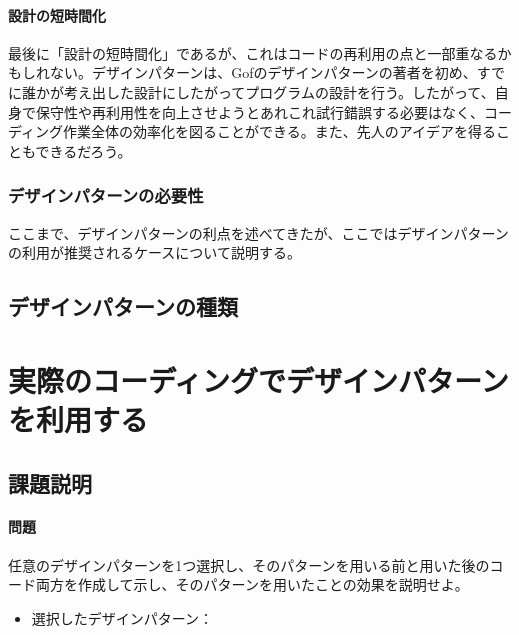 \documentclass[dvipdfmx]{jsarticle}
\begin{document}
\paragraph{設計の短時間化}最後に「設計の短時間化」であるが、これはコードの再利用の点と一部重なるかもしれない。デザインパターンは、Gofのデザインパターンの著者を初め、すでに誰かが考え出した設計にしたがってプログラムの設計を行う。したがって、自身で保守性や再利用性を向上させようとあれこれ試行錯誤する必要はなく、コーディング作業全体の効率化を図ることができる。また、先人のアイデアを得ることもできるだろう。
\subsubsection{デザインパターンの必要性}
ここまで、デザインパターンの利点を述べてきたが、ここではデザインパターンの利用が推奨されるケースについて説明する。
\subsection{デザインパターンの種類}


\section{実際のコーディングでデザインパターンを利用する}
\subsection{課題説明}
\paragraph{問題} 任意のデザインパターンを1つ選択し、そのパターンを用いる前と用いた後のコード両方を作成して示し、そのパターンを用いたことの効果を説明せよ。
\begin{itemize}
  \item 選択したデザインパターン：
\end{itemize}
\end{document}
